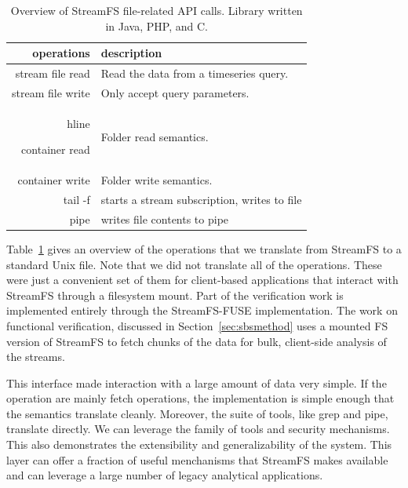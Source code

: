 \begin{table}[h]
\begin{center}
\begin{tabular}{| r | l |}
	\hline
	\textbf{operations} & \textbf{description} \\ \hline
	stream file read & Read the data from a timeseries query.    \\ \hline

	stream file write & Only accept query parameters. \\ hline

	container read & Folder read semantics.    \\ \hline

	container write & Folder write semantics.  \\ \hline

	tail -f & starts a stream subscription, writes to file \\ \hline

	pipe & writes file contents to pipe \\ \hline
\end{tabular}
\caption{Overview of StreamFS file-related API calls.  Library written in Java, PHP, and C.}
\label{tab:fuseops}
\end{center}
\end{table}

Table~\ref{tab:fuseops} gives an overview of the operations that we translate from StreamFS to a standard Unix file.
Note that we did not translate all of the operations.  These were just a convenient set of them for 
client-based applications that interact with StreamFS through a filesystem mount.
Part of the verification work is implemented entirely through the StreamFS-FUSE implementation.  The work
on functional verification, discussed in Section~\ref{sec:sbsmethod} uses a mounted FS version of StreamFS
to fetch chunks of the data for bulk, client-side analysis of the streams.

This interface made interaction with a large amount of data very simple.  If the operation are mainly 
fetch operations, the implementation is simple enough that the semantics translate cleanly.  Moreover, the suite of tools, 
like grep and pipe, translate directly.  We can leverage the family of tools and security mechanisms.
This also demonstrates the extensibility and generalizability of the system.  This layer can offer a fraction of
useful menchanisms that StreamFS makes available and can leverage a large number of legacy analytical applications.






